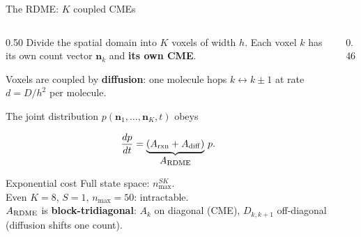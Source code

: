 \documentclass[10pt,aspectratio=169]{beamer}
\begin{document}
\begin{frame}{The RDME: $K$ coupled CMEs}

  \begin{columns}[T]
    \begin{column}{0.50\textwidth}
      Divide the spatial domain into $K$ voxels of width $h$.
      Each voxel $k$ has its own count vector $\bm{n}_k$ and \textbf{its own CME}.

      \medskip
      Voxels are coupled by \textbf{diffusion}: one molecule hops $k\leftrightarrow k{\pm}1$
      at rate $d = D/h^2$ per molecule.

      \medskip
      The joint distribution $p(\bm{n}_1,\ldots,\bm{n}_K,t)$ obeys

      \[
        \frac{dp}{dt} = \underbrace{(A_{\rm rxn} + A_{\rm diff})}_{\displaystyle A_{\rm RDME}}\,p.
      \]

      \vspace{0.3em}
      \begin{alertblock}{Exponential cost}
        Full state space: $n_{\max}^{SK}$.\\
        Even $K{=}8$, $S{=}1$, $n_{\max}{=}50$: intractable.\\[0.2em]
        $A_{\rm RDME}$ is \textbf{block-tridiagonal}: $A_k$ on diagonal (CME),
        $D_{k,k+1}$ off-diagonal (diffusion shifts one count).
      \end{alertblock}
    \end{column}
    \begin{column}{0.46\textwidth}
      \begin{center}
\end{center}
\end{column}
\end{columns}
\end{frame}
\end{document}
